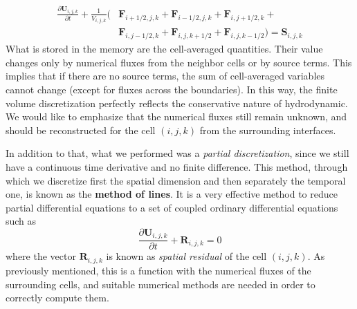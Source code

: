 \begin{equation}
\begin{split}
	\frac{\partial \mathbf{U}_{i, j, k}}{\partial t} + \frac{1}{V_{i, j, k}} ( & \mathbf{F}_{i + 1/2, j, k} + \mathbf{F}_{i - 1/2, j, k} +\mathbf{F}_{i , j + 1/2, k} + \\
	& \mathbf{F}_{i , j - 1/2, k} +  \mathbf{F}_{i , j, k + 1/2} + \mathbf{F}_{i , j, k - 1/2}) = \mathbf{S}_{i, j, k}
\end{split}
\end{equation}
What is stored in the memory are the cell-averaged quantities. Their value changes only by numerical fluxes from the neighbor cells or by source terms. This implies that if there are no source terms, the sum of cell-averaged variables cannot change (except for fluxes across the boundaries). In this way, the finite volume discretization perfectly reflects the conservative nature of hydrodynamic. We would like to emphasize that the numerical fluxes still remain unknown, and should be reconstructed for the cell $(i, j, k)$ from the surrounding interfaces. 

In addition to that, what we performed was a \textit{partial discretization}, since we still have a continuous time derivative and no finite difference. This method, through which we discretize first the spatial dimension and then separately the temporal one, is known as the \textbf{method of lines}. It is a very effective method to reduce partial differential equations to a set of coupled ordinary differential equations such as
\begin{equation}\label{eq:methodoflines}
	\frac{\partial \mathbf{U}_{i, j, k}}{\partial t} + \mathbf{R}_{i, j, k}=0
\end{equation}
where the vector $\mathbf{R}_{i, j, k}$ is known as \textit{spatial residual} of the cell $(i, j, k)$. As previously mentioned, this is a function with the numerical fluxes of the surrounding cells, and suitable numerical methods are needed in order to correctly compute them.
